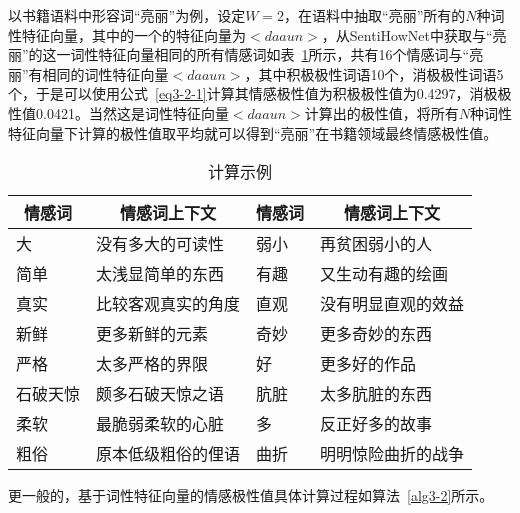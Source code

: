 以书籍语料中形容词“亮丽”为例，设定$ W=2 $，在语料中抽取“亮丽”所有的$ N $种词性特征向量，其中的一个的特征向量为$ <daaun> $，从SentiHowNet中获取与“亮丽”的这一词性特征向量相同的所有情感词如表~\ref{tab3-3-1}所示，共有16个情感词与“亮丽”有相同的词性特征向量$ <daaun> $，其中积极极性词语10个，消极极性词语5个，于是可以使用公式~\ref{eq3-2-1}计算其情感极性值为积极极性值为0.4297，消极极性值0.0421。当然这是词性特征向量$ <daaun> $计算出的极性值，将所有$ N $种词性特征向量下计算的极性值取平均就可以得到“亮丽”在书籍领域最终情感极性值。
\begin{table}[htp]
\centering
\caption{计算示例}
\label{tab3-3-1}
\begin{tabular}{|l|l|l|l|}
\hline
\multicolumn{1}{|c|}{情感词} & \multicolumn{1}{c|}{情感词上下文} & \multicolumn{1}{c|}{情感词} & \multicolumn{1}{c|}{情感词上下文} \\ \hline
大 & 没有多大的可读性 & 弱小 & 再贫困弱小的人 \\ \hline
简单 & 太浅显简单的东西 & 有趣 & 又生动有趣的绘画 \\ \hline
真实 & 比较客观真实的角度 & 直观 & 没有明显直观的效益 \\ \hline
新鲜 & 更多新鲜的元素 & 奇妙 & 更多奇妙的东西 \\ \hline
严格 & 太多严格的界限 & 好 & 更多好的作品 \\ \hline
石破天惊 & 颇多石破天惊之语 & 肮脏 & 太多肮脏的东西 \\ \hline
柔软 & 最脆弱柔软的心脏 & 多 & 反正好多的故事 \\ \hline
粗俗 & 原本低级粗俗的俚语 & 曲折 & 明明惊险曲折的战争 \\ \hline
\end{tabular}
\end{table}

更一般的，基于词性特征向量的情感极性值具体计算过程如算法~\ref{alg3-2}所示。

